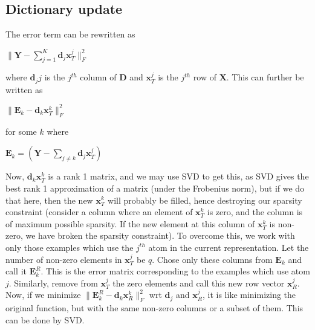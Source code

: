 \documentclass[10pt,a4paper,final]{article}
\begin{document}
\subsection{Dictionary update}
The error term can be rewritten as
\begin{center}
$\|\mathbf{Y}-\sum_{j=1}^{K}\mathbf{d}_j\mathbf{x}_T^j\|_F^2$
\end{center}
where $\mathbf{d}_jj$ is the $j^{th}$ column of $\mathbf{D}$ and $\mathbf{x}_T^j$ is the $j^{th}$ row of $\mathbf{X}$. This can further be written as 
\begin{center}
$\|\mathbf{E}_k - \mathbf{d}_k\mathbf{x}_T^k\|_F^2$
\end{center}
for some $k$ where 
\begin{center}
$\mathbf{E}_k=\left(\mathbf{Y}-\sum_{j \neq k} \mathbf{d}_j \mathbf{x}_T^j\right)$
\end{center}
Now, $\mathbf{d}_k\mathbf{x}_T^k$ is a rank 1 matrix, and we may use SVD to get this, as SVD gives the best rank 1 approximation of a matrix (under the Frobenius norm), but if we do that here, then the new $\mathbf{x}_T^k$ will probably be filled, hence destroying our sparsity constraint (consider a column where an element of $\mathbf{x}_T^k$ is zero, and the column is of maximum possible sparsity. If the new element at this column of $\mathbf{x}_T^k$ is non-zero, we have broken the sparsity constraint). 
To overcome this, we work with only those examples which use the $j^{th}$ atom in the current representation. Let the number of non-zero elements in $\mathbf{x}_T^j$ be $q$. Chose only these columns from $\mathbf{E}_k$ and call it $\mathbf{E}_k^R$. This is the error matrix corresponding to the examples which use atom $j$. Similarly, remove from $\mathbf{x}_T^j$ the zero elements and call this new row vector $\mathbf{x}_R^j$. 
Now, if we minimize $\|\mathbf{E}_k^R - \mathbf{d}_k\mathbf{x}_R^k\|_F^2$ wrt $\mathbf{d}_j$ and $\mathbf{x}_R^j$, it is like minimizing the original function, but with the same non-zero columns or a subset of them. This can be done by SVD.
\end{document}
